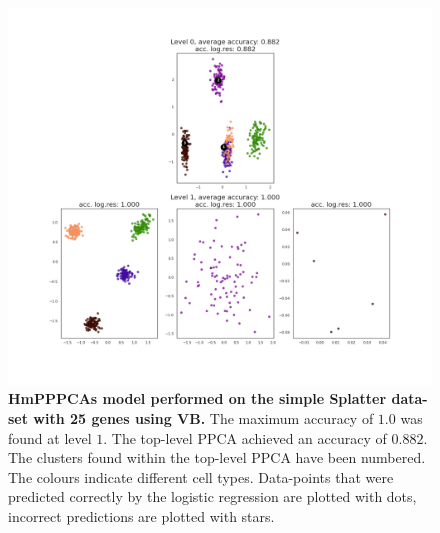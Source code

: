 \begin{figure}
    \centering
    \includegraphics[width=\linewidth]{figs/simple_25_vb.png}
    \caption[HmPPPCAs model performed on the simple Splatter data-set with 25 genes using VB]{\small \textbf{HmPPPCAs model performed on the simple Splatter data-set with 25 genes using VB.} \small The maximum accuracy of $1.0$ was found at level $1$. The top-level PPCA achieved an accuracy of $0.882$. The clusters found within the top-level PPCA have been numbered. The colours indicate different cell types. Data-points that were predicted correctly by the logistic regression are plotted with dots, incorrect predictions are plotted with stars.}
    \label{fig:simple_25_vb}
\end{figure}

